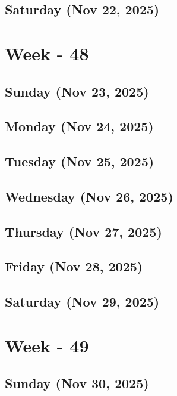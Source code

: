 \subsection*{Saturday (Nov 22, 2025)}


\section{Week - 48}
\subsection*{Sunday (Nov 23, 2025)}
\subsection*{Monday (Nov 24, 2025)}
\subsection*{Tuesday (Nov 25, 2025)}
\subsection*{Wednesday (Nov 26, 2025)}
\subsection*{Thursday (Nov 27, 2025)}
\subsection*{Friday (Nov 28, 2025)}
\subsection*{Saturday (Nov 29, 2025)}


\section{Week - 49}
\subsection*{Sunday (Nov 30, 2025)}


\newpage
\begin{spacing}{1.0}
\renewcommand{\bibname}{\bf{References}}


\end{spacing}